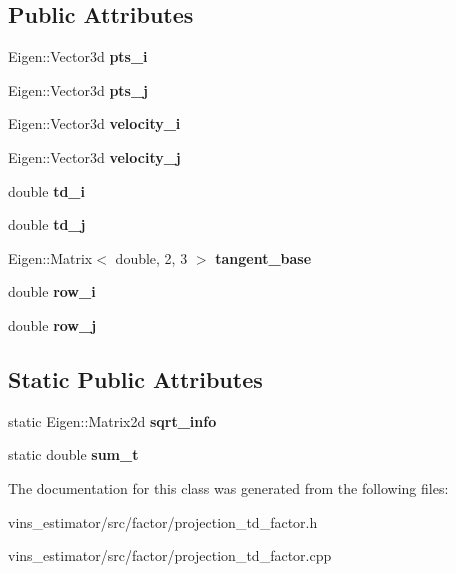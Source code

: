 \subsection*{Public Attributes}
\begin{DoxyCompactItemize}
\item 
\mbox{\label{classProjectionTdFactor_a3bb1f7046045912b694ecdb853b2621a}} 
Eigen\+::\+Vector3d {\bfseries pts\+\_\+i}
\item 
\mbox{\label{classProjectionTdFactor_a148ce15b82b739fbd8bb55d258ff7ffd}} 
Eigen\+::\+Vector3d {\bfseries pts\+\_\+j}
\item 
\mbox{\label{classProjectionTdFactor_abfd7bbf122693991b7f88f15e404cc5a}} 
Eigen\+::\+Vector3d {\bfseries velocity\+\_\+i}
\item 
\mbox{\label{classProjectionTdFactor_a5f1976fe99e15c9c6c760c08dc540610}} 
Eigen\+::\+Vector3d {\bfseries velocity\+\_\+j}
\item 
\mbox{\label{classProjectionTdFactor_afa1ebcc4e99461ef26d3ed157575daf2}} 
double {\bfseries td\+\_\+i}
\item 
\mbox{\label{classProjectionTdFactor_a7f00a4f5183ca9edb086f84254d80094}} 
double {\bfseries td\+\_\+j}
\item 
\mbox{\label{classProjectionTdFactor_a9f82c101670e4ecd36f7de54f091f2a2}} 
Eigen\+::\+Matrix$<$ double, 2, 3 $>$ {\bfseries tangent\+\_\+base}
\item 
\mbox{\label{classProjectionTdFactor_aa4bf485a08d475c917a504e3fe758aed}} 
double {\bfseries row\+\_\+i}
\item 
\mbox{\label{classProjectionTdFactor_aa1b634bde871441c6bc6ed3de39eee72}} 
double {\bfseries row\+\_\+j}
\end{DoxyCompactItemize}
\subsection*{Static Public Attributes}
\begin{DoxyCompactItemize}
\item 
\mbox{\label{classProjectionTdFactor_a313cac450151c3b5833079dd6e1fab56}} 
static Eigen\+::\+Matrix2d {\bfseries sqrt\+\_\+info}
\item 
\mbox{\label{classProjectionTdFactor_a1c93211ab118fdfb5afa458d0d933874}} 
static double {\bfseries sum\+\_\+t}
\end{DoxyCompactItemize}


The documentation for this class was generated from the following files\+:\begin{DoxyCompactItemize}
\item 
vins\+\_\+estimator/src/factor/projection\+\_\+td\+\_\+factor.\+h\item 
vins\+\_\+estimator/src/factor/projection\+\_\+td\+\_\+factor.\+cpp\end{DoxyCompactItemize}
